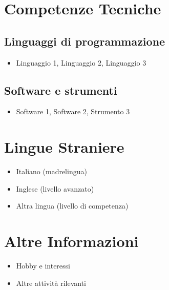 \documentclass[a4paper, 11pt]{article}
\newcommand{\cvsection}[1]{\section*{#1}}
\newcommand{\cvsubsection}[1]{\subsection*{#1}}
\begin{document}
\cvsection{Competenze Tecniche}
\cvsubsection{Linguaggi di programmazione}
\begin{itemize}[leftmargin=*]
    \item Linguaggio 1, Linguaggio 2, Linguaggio 3
\end{itemize}

\cvsubsection{Software e strumenti}
\begin{itemize}[leftmargin=*]
    \item Software 1, Software 2, Strumento 3
\end{itemize}

\cvsection{Lingue Straniere}
\begin{itemize}[leftmargin=*]
    \item Italiano (madrelingua)
    \item Inglese (livello avanzato)
    \item Altra lingua (livello di competenza)
\end{itemize}

\cvsection{Altre Informazioni}
\begin{itemize}[leftmargin=*]
    \item Hobby e interessi
    \item Altre attività rilevanti
\end{itemize}

\end{document}
